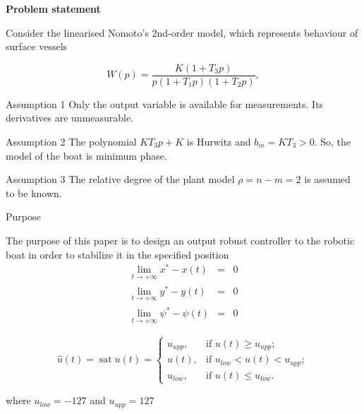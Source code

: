 \documentclass[10pt,pdf,hyperref={unicode}]{beamer}
\begin{document}
\begin{frame}

\begin{center}
	{\Large \textbf {Problem statement}\\}
\end{center}

Consider the linearised Nomoto's 2nd-order model, which represents behaviour of surface vessels

\begin{equation}
W(p)=\frac{K(1+T_3p)}{p(1+T_1p)(1+T_2p)},
\end{equation}

\begin{block}{Assumption 1}
Only the output variable is available for measurements. Its derivatives are unmeasurable.	
\end{block}

\begin{block}{Assumption 2}
	The polynomial $KT_3p+K$ is Hurwitz and $b_m=KT_3>0$. So, the model of the boat is minimum phase.	
\end{block}

\begin{block}{Assumption 3}
	The relative degree of the plant model $\rho=n-m=2$ is assumed to be known.
\end{block}

\end{frame}

\begin{frame}{Purpose}

The purpose of this paper is to design an output robust controller to the robotic boat in order to stabilize it in the specified position
\begin{eqnarray}
\lim_{t\rightarrow+\infty}x^*-x(t)&=&0\\
\lim_{t\rightarrow+\infty}y^*-y(t)&=&0\\
\lim_{t\rightarrow+\infty}\psi^*-\psi(t)&=&0
\end{eqnarray}

\begin{equation}
\label{u_sat}
\hat u(t)=\mathop{\mathrm{sat}}\nolimits u(t)=
\left\{
\begin{array}{ll}
u_{upp}, & \mbox{if $u(t)\ge u_{upp}$};\\
u(t), & \mbox{if $u_{low}<u(t)<u_{upp}$};\\
u_{low}, & \mbox{if $u(t)\le u_{low}.$}
\end{array}
\right.
\end{equation}

\vspace{0.2cm}
\centering where $u_{low}=-127$ and $u_{upp}=127$ 

\end{frame}
\end{document}
